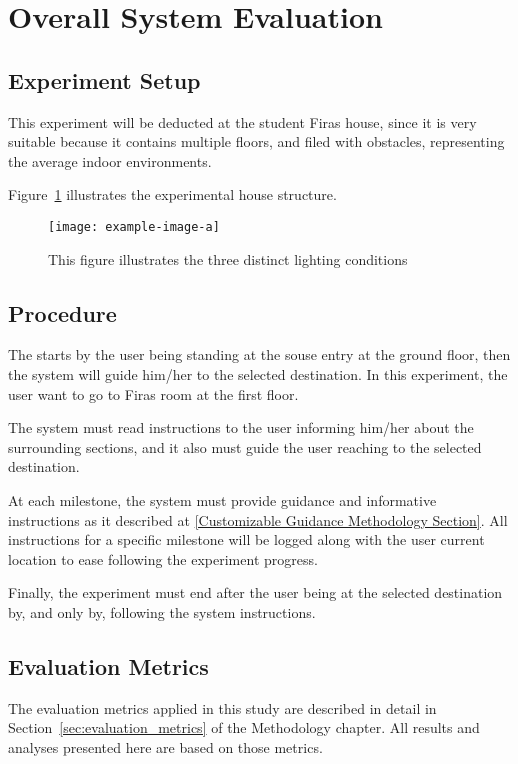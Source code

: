 \section{Overall System Evaluation}

\subsection{Experiment Setup}
This experiment will be deducted at the student Firas house, since it is very suitable because it contains multiple floors, and filed with obstacles, representing the average indoor environments.

Figure~\ref{overall_system_experiment_setup} illustrates the experimental house structure.

\begin{figure}[h!]
	\centering
	\texttt{[image: example-image-a]}
	\caption{This figure illustrates the three distinct lighting conditions}
	\label{overall_system_experiment_setup}
\end{figure}

\subsection{Procedure}
The starts by the user being standing at the souse entry at the ground floor, then the system will guide him/her to the selected destination. In this experiment, the user want to go to Firas room at the first floor.

The system must read instructions to the user informing him/her about the surrounding sections, and it also must guide the user reaching to the selected destination.

At each milestone, the system must provide guidance and informative instructions as it described at \ref{Customizable Guidance Methodology Section}. All instructions for a specific milestone will be logged along with the user current location to ease following the experiment progress.

Finally, the experiment must end after the user being at the selected destination by, and only by, following the system instructions.

\subsection{Evaluation Metrics}
The evaluation metrics applied in this study are described in detail in Section~\ref{sec:evaluation_metrics} of the Methodology chapter. All results and analyses presented here are based on those metrics.


